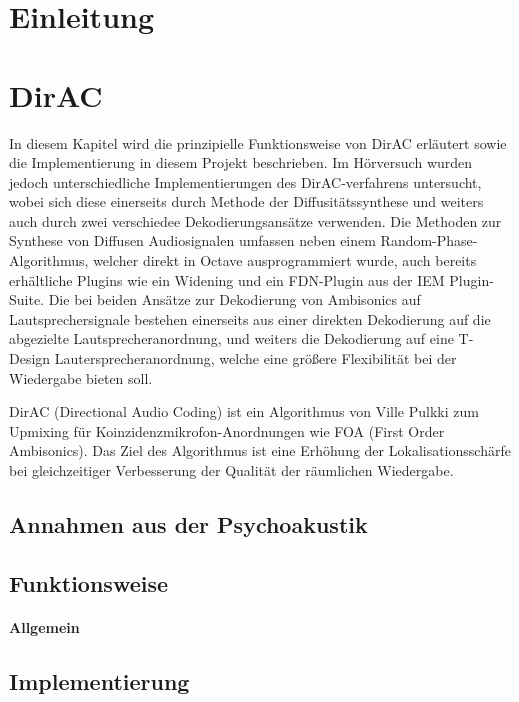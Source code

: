 \documentclass[12pt, a4paper]{article}
\begin{document}
\tableofcontents
\newpage

\section{Einleitung}


\section{DirAC}
In diesem Kapitel wird die prinzipielle Funktionsweise von DirAC erläutert sowie die Implementierung in diesem Projekt beschrieben. Im Hörversuch wurden jedoch unterschiedliche Implementierungen des DirAC-verfahrens untersucht, wobei sich diese einerseits durch Methode der Diffusitätssynthese und weiters auch durch zwei verschiedee Dekodierungsansätze verwenden. Die Methoden zur Synthese von Diffusen Audiosignalen umfassen neben einem Random-Phase-Algorithmus, welcher direkt in Octave ausprogrammiert wurde, auch bereits erhältliche Plugins wie ein Widening und ein FDN-Plugin aus der IEM Plugin-Suite. Die bei beiden Ansätze zur Dekodierung von Ambisonics auf Lautsprechersignale bestehen einerseits aus einer direkten Dekodierung auf die abgezielte Lautsprecheranordnung, und weiters die Dekodierung auf eine T-Design Lautersprecheranordnung, welche eine größere Flexibilität bei der Wiedergabe bieten soll.

DirAC (Directional Audio Coding) ist ein Algorithmus von Ville Pulkki \cite{pulkki} zum Upmixing für Koinzidenzmikrofon-Anordnungen wie FOA (First Order Ambisonics). Das Ziel des Algorithmus ist eine Erhöhung der Lokalisationsschärfe bei gleichzeitiger Verbesserung der Qualität der räumlichen Wiedergabe.
    \subsection{Annahmen aus der Psychoakustik} \label{annahmen}
    
    \subsection{Funktionsweise}
    
        \paragraph{Allgemein}
        
    \subsection{Implementierung}
    
\end{document}
